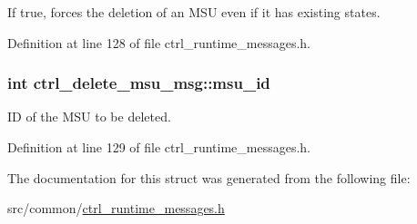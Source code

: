 If {\ttfamily true}, forces the deletion of an M\-S\-U even if it has existing states. 



Definition at line 128 of file ctrl\-\_\-runtime\-\_\-messages.\-h.

\hypertarget{structctrl__delete__msu__msg_a1ae44491d0840269eeec01757753fcb6}{
\subsubsection[{msu\-\_\-id}]{\setlength{\rightskip}{0pt plus 5cm}int ctrl\-\_\-delete\-\_\-msu\-\_\-msg\-::msu\-\_\-id}}\label{structctrl__delete__msu__msg_a1ae44491d0840269eeec01757753fcb6}


I\-D of the M\-S\-U to be deleted. 



Definition at line 129 of file ctrl\-\_\-runtime\-\_\-messages.\-h.



The documentation for this struct was generated from the following file\-:\begin{DoxyCompactItemize}
\item 
src/common/\hyperlink{ctrl__runtime__messages_8h}{ctrl\-\_\-runtime\-\_\-messages.\-h}\end{DoxyCompactItemize}
